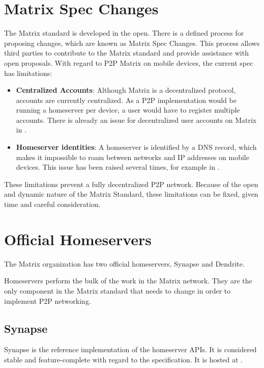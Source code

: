 \section{Matrix Spec Changes}
The Matrix standard is developed in the open.
There is a defined process for proposing changes, which are known as Matrix Spec Changes\cite{matrix_org_spec_changes}.
This process allows third parties to contribute to the Matrix standard and provide assistance with open proposals.
With regard to \ac{P2P} Matrix on mobile devices, the current spec has limitations:
\begin{itemize}
	\item{
	      \textbf{Centralized Accounts}:
	      Although Matrix is a decentralized protocol, accounts are currently centralized.
	      As a \ac{P2P} implementation would be running a homeserver per device, a user would have to register multiple accounts.
	      There is already an issue for decentralized user accounts on Matrix in .
	      }
	\item{
	      \textbf{Homeserver identities}:
	      A homeserver is identified by a DNS record, which makes it impossible to roam between networks and IP addresses on mobile devices.
	      This issue has been raised several times, for example in .
	      }
\end{itemize}

These limitations prevent a fully decentralized \ac{P2P} network.
Because of the open and dynamic nature of the Matrix Standard, these limitations can be fixed, given time and careful consideration.

\section{Official Homeservers}\label{sec:official_homeservers}
The Matrix organization has two official homeservers, Synapse\cite{matrix_org_synapse} and Dendrite\cite{matrix_org_dendrite}.

Homeservers perform the bulk of the work in the Matrix network.
They are the only component in the Matrix standard that needs to change in order to implement \ac{P2P} networking\cite{fosdem_event_p2p_matrix}.

\subsection{Synapse}
Synapse is the reference implementation of the homeserver \ac{API}s.
It is considered stable and feature-complete with regard to the specification.
It is hosted at .

